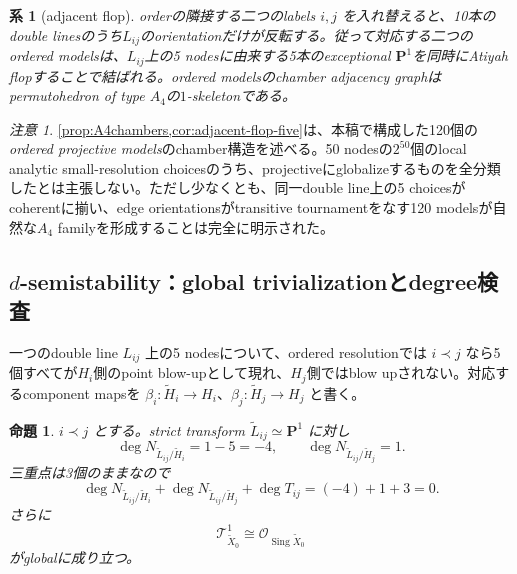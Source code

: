 \documentclass[11pt,a4paper]{ltjsarticle}
\newtheorem{proposition}[theorem]{命題}
\newtheorem{corollary}[theorem]{系}
\theoremstyle{definition}
\theoremstyle{remark}
\newtheorem{remark}[theorem]{注意}
\newcommand{\PP}{\mathbf P}
\newcommand{\Sing}{\operatorname{Sing}}
\begin{document}
\begin{corollary}[adjacent flop]\label{cor:adjacent-flop-five}
orderの隣接する二つのlabels $i,j$ を入れ替えると、10本のdouble linesのうち$L_{ij}$のorientationだけが反転する。従って対応する二つのordered modelsは、$L_{ij}$上の5 nodesに由来する5本のexceptional $\PP^1$を同時にAtiyah flopすることで結ばれる。ordered modelsのchamber adjacency graphはpermutohedron of type $A_4$の$1$-skeletonである。
\end{corollary}

\begin{remark}
\cref{prop:A4chambers,cor:adjacent-flop-five}は、本稿で構成した120個の\emph{ordered projective models}のchamber構造を述べる。50 nodesの$2^{50}$個のlocal analytic small-resolution choicesのうち、projectiveにglobalizeするものを全分類したとは主張しない。ただし少なくとも、同一double line上の5 choicesがcoherentに揃い、edge orientationsがtransitive tournamentをなす120 modelsが自然な$A_4$ familyを形成することは完全に明示された。
\end{remark}

\subsection{$d$-semistability：global trivializationとdegree検査}

一つのdouble line $L_{ij}$ 上の5 nodesについて、ordered resolutionでは $i\prec j$ なら5個すべてが$H_i$側のpoint blow-upとして現れ、$H_j$側ではblow upされない。対応するcomponent mapsを
$\beta_i:\widetilde H_i\to H_i$、$\beta_j:\widetilde H_j\to H_j$ と書く。

\begin{proposition}\label{prop:dsemistable-resolved}
$i\prec j$ とする。strict transform $\widetilde L_{ij}\simeq\PP^1$ に対し
\[
 \deg N_{\widetilde L_{ij}/\widetilde H_i}=1-5=-4,
 \qquad
 \deg N_{\widetilde L_{ij}/\widetilde H_j}=1.
\]
三重点は3個のままなので
\begin{equation}\label{eq:dsemi-degree-zero}
 \deg N_{\widetilde L_{ij}/\widetilde H_i}
 +\deg N_{\widetilde L_{ij}/\widetilde H_j}
 +\deg T_{ij}=(-4)+1+3=0.
\end{equation}
さらに
\begin{equation}\label{eq:dsemi-global}
 \mathcal T^1_{\widetilde X_0}\cong
 \mathcal O_{\Sing\widetilde X_0}
\end{equation}
がglobalに成り立つ。
\end{proposition}
\end{document}
